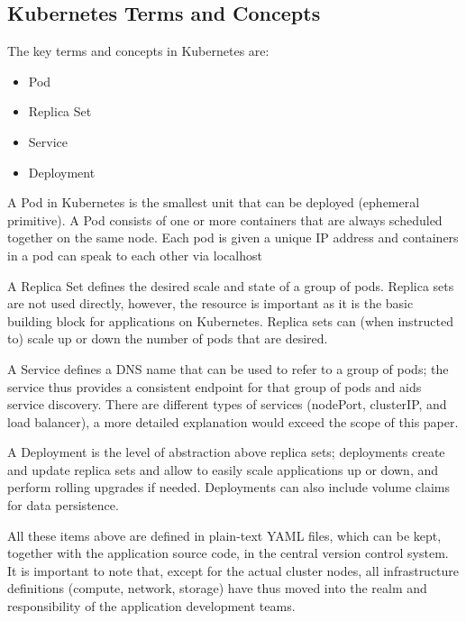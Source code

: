 \subsection{Kubernetes Terms and Concepts}

The key terms and concepts in Kubernetes are:
\begin{itemize}
\item Pod
\item Replica Set
\item Service
\item Deployment
\end{itemize}

A Pod in Kubernetes is the smallest unit that can be deployed (ephemeral primitive). A Pod consists of one or more containers that are always scheduled together on the same node. Each pod is given a unique IP address and containers in a pod can speak to each other via localhost

A Replica Set defines the desired scale and state of a group of pods. Replica sets are not used directly, however, the resource is important as it is the basic building block for applications on Kubernetes. Replica sets can (when instructed to) scale up or down the number of pods that are desired.

A Service defines a DNS name that can be used to refer to a group of pods; the service thus provides a consistent endpoint for that group of pods and aids service discovery. There are different types of services (nodePort, clusterIP, and load balancer), a more detailed explanation would exceed the scope of this paper.

A Deployment is the level of abstraction above replica sets; deployments create and update replica sets and allow to easily scale applications up or down, and perform rolling upgrades if needed. Deployments can also include volume claims for data persistence.

All these items above are defined in plain-text YAML files, which can be kept, together with the application source code, in the central version control system. It is important to note that, except for the actual cluster nodes, all infrastructure definitions (compute, network, storage) have thus moved into the realm and responsibility of the application development teams.
